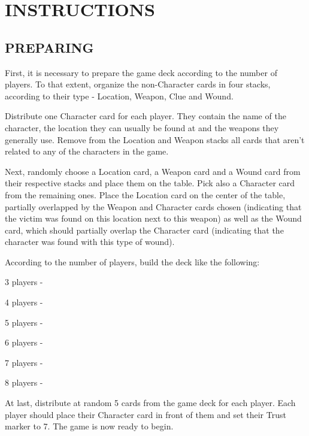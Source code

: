 \documentclass[a4paper, 11pt]{article}
\begin{document}
\section*{INSTRUCTIONS}

\vspace{5mm}


\subsection*{PREPARING}

	First, it is necessary to prepare the game deck according to the number of players. To that extent, organize the non-Character cards in four stacks, according to their type - Location, Weapon, Clue and Wound.

	Distribute one Character card for each player. They contain the name of the character, the location they can usually be found at and the weapons they generally use. Remove from the Location and Weapon stacks all cards that aren't related to any of the characters in the game.


	
	Next, randomly choose a Location card, a Weapon card and a Wound card from their respective stacks and place them on the table. Pick also a Character card from the remaining ones. Place the Location card on the center of the table, partially overlapped by the Weapon and Character cards chosen (indicating that the victim was found on this location next to this weapon) as well as the Wound card, which should partially overlap the Character card (indicating that the character was found with this type of wound). 

	According to the number of players, build the deck like the following:


	3 players - 

	4 players - 

	5 players - 

	6 players - 

	7 players  - 

	8 players - 

	At last, distribute at random 5 cards from the game deck for each player. Each player should place their Character card in front of them and set their Trust marker to 7. The game is now ready to begin.
\end{document}
